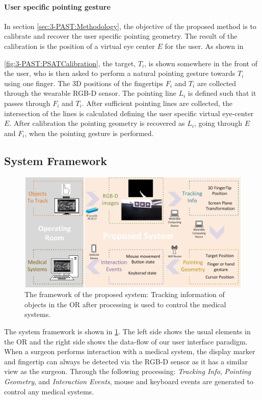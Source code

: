 \paragraph{User specific pointing gesture}
In section \ref{sec:3-PAST:Methodology}, the objective of the proposed method is to calibrate and recover the user specific pointing geometry. The result of the calibration is the position of a virtual eye center $E$ for the user.
As shown in \figurename{ \ref{fig:3-PAST:PSATCalibration}, the target, $T_i$, is shown somewhere in the front of the user, who is then asked to perform a natural pointing gesture towards $T_i$ using one finger. The 3D positions of the fingertips $F_i$ and $T_i$ are collected through the wearable RGB-D sensor. The pointing line $L_i$ is defined such that it passes through $F_i$ and $T_i$. After sufficient pointing lines are collected, the intersection of the lines is calculated defining the user specific virtual eye-center $E$. After calibration the pointing geometry is recovered as $L_{i}$, going through $E$ and  $F_i$, when the pointing gesture is performed.

\subsection{System Framework}

\begin{figure} [htb]
	\includegraphics[width=1\textwidth]{figures/3-PointingOR/Workflow.png}
	\caption{The framework of the proposed system: Tracking information of objects in the OR after processing is used to control the medical systems. }
	\label{fig:3-PointingOR:Workflow}       %
\end{figure}
The system framework is shown in \figurename{\ref{fig:3-PointingOR:Workflow}}.
The left side shows the usual elements in the OR and the right side shows the data-flow of our user interface paradigm. When a surgeon performs interaction with a medical system, the display marker and fingertip can always be detected via the RGB-D sensor as it has a similar view as the surgeon. 
Through the following processing: \textit{Tracking Info}, \textit{Pointing Geometry}, and \textit{Interaction Events}, mouse and keyboard events are generated to control any medical systems.
}
